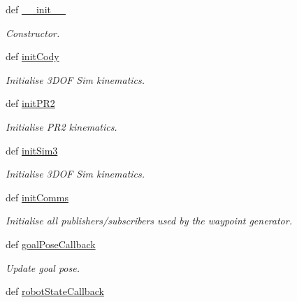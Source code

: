 \begin{DoxyCompactItemize}
\item 
def \hyperlink{classhrl__haptic__mpc_1_1waypoint__generator_1_1_waypoint_generator_a826f163218a8fe7f8b6c065a5a8c2adc}{\-\_\-\-\_\-init\-\_\-\-\_\-}
\begin{DoxyCompactList}\small\item\em \-Constructor. \end{DoxyCompactList}\item 
def \hyperlink{classhrl__haptic__mpc_1_1waypoint__generator_1_1_waypoint_generator_a6341d3f8bba07767d7818828962841e5}{init\-Cody}
\begin{DoxyCompactList}\small\item\em \-Initialise 3\-D\-O\-F \-Sim kinematics. \end{DoxyCompactList}\item 
def \hyperlink{classhrl__haptic__mpc_1_1waypoint__generator_1_1_waypoint_generator_aa71a8e08dbc2142cd4eec29cf507e51e}{init\-P\-R2}
\begin{DoxyCompactList}\small\item\em \-Initialise \-P\-R2 kinematics. \end{DoxyCompactList}\item 
def \hyperlink{classhrl__haptic__mpc_1_1waypoint__generator_1_1_waypoint_generator_a18bcdb74ae1377b23bbff450c95a4b01}{init\-Sim3}
\begin{DoxyCompactList}\small\item\em \-Initialise 3\-D\-O\-F \-Sim kinematics. \end{DoxyCompactList}\item 
def \hyperlink{classhrl__haptic__mpc_1_1waypoint__generator_1_1_waypoint_generator_a465dcb220da8fe7c9b4303c2c2f7444b}{init\-Comms}
\begin{DoxyCompactList}\small\item\em \-Initialise all publishers/subscribers used by the waypoint generator. \end{DoxyCompactList}\item 
def \hyperlink{classhrl__haptic__mpc_1_1waypoint__generator_1_1_waypoint_generator_a52a33d0efa442357b23e9eb4584dafaa}{goal\-Pose\-Callback}
\begin{DoxyCompactList}\small\item\em \-Update goal pose. \end{DoxyCompactList}\item 
def \hyperlink{classhrl__haptic__mpc_1_1waypoint__generator_1_1_waypoint_generator_a29f592cb285a6073f92081ebf308478b}{robot\-State\-Callback}

\end{DoxyCompactItemize}
